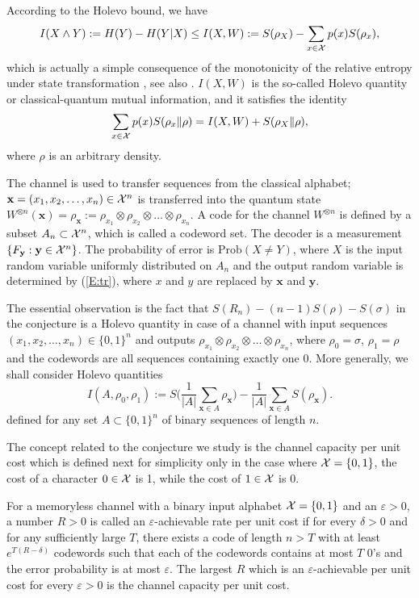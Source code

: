 \documentclass[12pt,a4paper]{article}
\def\Prob{{\mathrm{Prob}}}
\def\eps{\varepsilon}
\def\iX{{\cal X}}
\def\ot{\otimes}
\def\bfx{\mathbf{x}}
\def\bfy{\mathbf{y}}
\begin{document}
According to the Holevo bound, we have
\begin{equation}\label{E:Ho}
I(X\wedge Y):=H(Y)-H(Y|X) \le I(X,W):=S(\rho_X)-\sum_{x \in \iX} p(x) S(\rho_x),
\end{equation}
which is actually a simple consequence of the monotonicity of the relative entropy
under state transformation \cite{Ho1973b}, see also \cite{OPW}. $I(X,W)$ is the
so-called Holevo quantity or classical-quantum  mutual information, and it satisfies
the identity
\begin{equation}\label{E:ident}
\sum_{x \in \iX} p(x) S(\rho_x\|\rho)=I(X,W)+S(\rho_X\|\rho),
\end{equation}
where $\rho$ is an arbitrary density.

The channel is used to transfer sequences from the classical alphabet;
$\bfx=(x_1,x_2,\dots,x_n) \in \iX^n$ is transferred into the quantum state
$W^{\ot n}(\bfx)=\rho_\bfx:=\rho_{x_1}\ot \rho_{x_2}\ot \dots \ot \rho_{x_n}$.
A code for the channel $W^{\ot n}$ is defined by a subset $A_n \subset \iX^n$,
which is called a codeword set. The decoder is a measurement
$\{F_\bfy: \bfy \in \iX^n\}$. The probability of error is $\Prob(X\ne Y)$, where
$X$ is the input random variable uniformly distributed on $A_n$ and the output
random variable is determined by (\ref{E:tr}), where $x$ and $y$ are replaced by
$\bfx$ and $\bfy$.

The essential observation is the fact that $S(R_n)- (n-1)S(\rho)-S(\sigma)$
in the conjecture is a Holevo quantity in case of a channel with input
sequences $(x_1,x_2,\dots, x_n)\in \{0,1\}^n$ and outputs
$\rho_{x_1}\ot \rho_{x_2}\ot \dots \ot\rho_{x_n}$, where $\rho_0=\sigma$,
$\rho_1=\rho$ and the codewords are all sequences containing exactly one 0. More
generally, we shall consider Holevo quantities
$$
I(A,\rho_0,\rho_1):= S\Big(\frac{1}{|A|}\sum_{\bfx \in A}
\rho_\bfx\Big)-\frac{1}{|A|}\sum_{\bfx \in A}
S(\rho_\bfx).
$$
defined for any set $A \subset \{0,1\}^n$ of binary sequences of length $n$.

The concept related to the conjecture we study is the channel capacity per
unit cost which is defined next for simplicity only in the case where
$\iX=\{0,1\}$, the cost of a character $0\in \iX$ is 1, while the cost of
$1 \in \iX$ is 0.

For a memoryless channel with a binary input alphabet $\iX=\{0,1\}$ and
an $\eps>0$, a number $R>0$ is called an $\eps$-achievable
rate per unit cost if for every $\delta >0$ and for any sufficiently large $T$, 
there exists a code of length $n>T$ with at least $e^{T(R-\delta)}$
codewords such that each of the codewords contains at most $T$ 0's and the error
probability is at most $\eps$. The largest $R$ which is an $\eps$-achievable
per unit cost for every $\eps>0$ is the channel capacity per unit cost.
\end{document}
